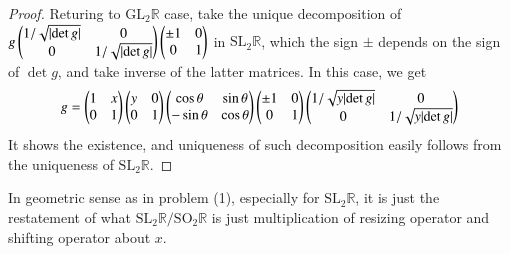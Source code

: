 \documentclass[a4paper, 12pt]{article}
\theoremstyle{Mydefinition}
\theoremstyle{Mytheorem}
\begin{document}
\begin{enumerate}
\begin{proof}
    Returing to $\mathrm{GL}_2\mathbb{R}$ case, take the unique decomposition of $g\begin{pmatrix}
        1/\sqrt{\abs{\det g}} & 0 \\ 0 & 1/\sqrt{\abs{\det g}}
    \end{pmatrix}\begin{pmatrix}
        \pm 1 & 0 \\ 0 & 1
    \end{pmatrix}$ in $\mathrm{SL}_2\mathbb{R}$, which the sign $\pm$ depends on the sign of $\det g$, and take inverse of the latter matrices. In this case, we get
    \begin{equation}
        g = \begin{pmatrix}
                1 & x\\
                0 & 1
            \end{pmatrix}
            \begin{pmatrix}
                y & 0\\
                0 & 1
            \end{pmatrix}
            \begin{pmatrix}
                \cos\theta & \sin\theta \\
                -\sin\theta & \cos \theta
            \end{pmatrix}\begin{pmatrix}
        \pm 1 & 0 \\ 0 & 1
    \end{pmatrix}\begin{pmatrix}
        1/\sqrt{y\abs{\det g}} & 0 \\ 0 & 1/\sqrt{y\abs{\det g}}
    \end{pmatrix}
    \end{equation}
    It shows the existence, and uniqueness of such decomposition easily follows from the uniqueness of $\mathrm{SL}_2\mathbb{R}$.
    \end{proof}
    In geometric sense as in problem (1), especially for $\mathrm{SL}_2\mathbb{R}$, it is just the restatement of what $\mathrm{SL}_2\mathbb{R}/\mathrm{SO}_2\mathbb{R}$ is just multiplication of resizing operator and shifting operator about $x$.
    

\end{enumerate}
\end{document}
